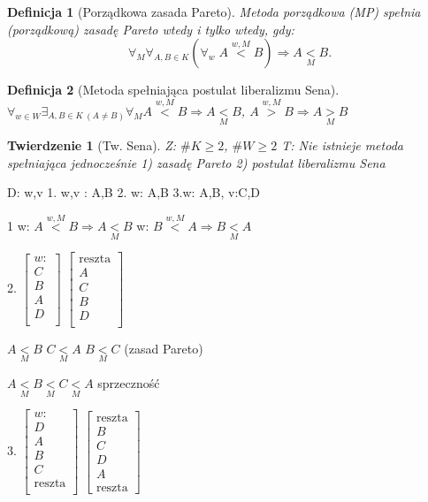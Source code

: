 \documentclass[12pt,a4paper]{article}
\theoremstyle{break}
\newtheorem{definition}{Definicja}[section]
\newtheorem{theorem}{Twierdzenie}[section]
\begin{document}
	\begin{definition}[Porządkowa zasada Pareto]
		Metoda porządkowa (MP) spełnia (porządkową) zasadę Pareto wtedy i tylko wtedy, gdy:
		\[
		\forall_M \forall_{A, B \in K} \left( \forall_w \; A \overset{w, M}{<} B \right) \Rightarrow A \underset{M}{<} B.
		\]
	\end{definition}
	
	\begin{definition}[Metoda spełniająca postulat liberalizmu Sena]
		$\forall_{w\in W}\exists_{A,B\in K\: (A\neq B)} \forall_M A\overset{w,M}{<}B \Rightarrow A\underset{M}{<}B$, $A\overset{w,M}{>}B\Rightarrow A\underset{M}{>}B$
	\end{definition}
	
	\begin{theorem}[Tw. Sena]
		Z: $\# K\geq 2$, $\# W \geq 2$
		T: Nie istnieje metoda spełniająca jednocześnie 
		1) zasadę Pareto
		2) postulat liberalizmu Sena
	\end{theorem}
	
	D: w,v
	1. w,v : A,B
	2. w: A,B
	3.w: A,B, v:C,D
	
	1 w: $A\overset{w,M}{<}B\Rightarrow A\underset{M}{<}B$ 
	w: $B\overset{w,M}{<}A\Rightarrow B\underset{M}{<}A$
	
	2. $\begin{bmatrix}
		w:\\
		C\\
		B\\
		A\\
		D\\
	\end{bmatrix}$ $\begin{bmatrix}
	\text{reszta}\\
	A\\
	C\\
	B\\
	D\\
	\end{bmatrix}$
	
	
	
	$A\underset{M}{<}B$ $C\underset{M}{<}A$ $B\underset{M}{<}C$ (zasad Pareto)
	
	$A\underset{M}{<}B\underset{M}{<}C\underset{M}{<}A$ sprzeczność
	
	3. $\begin{bmatrix}
		w:\\
		D\\
		A\\
		B\\
		C\\
		\text{reszta}\\
	\end{bmatrix}$ $\begin{bmatrix}
		\text{reszta}\\
		B\\
		C\\
		D\\
		A\\
		\text{reszta}
	\end{bmatrix}$
	
\end{document}
